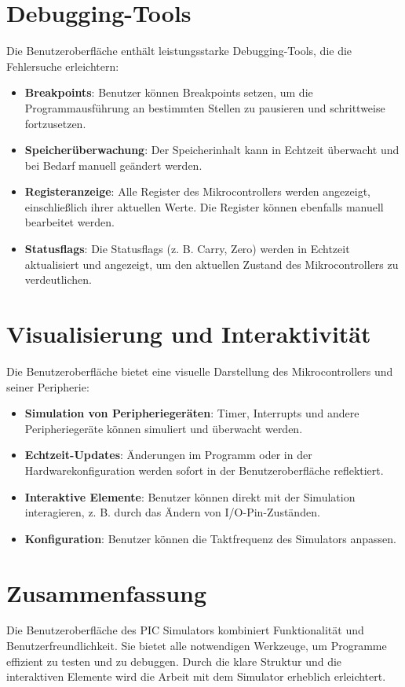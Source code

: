 \section{Debugging-Tools}
Die Benutzeroberfläche enthält leistungsstarke Debugging-Tools, die die Fehlersuche erleichtern:
\begin{itemize}
    \item \textbf{Breakpoints}: Benutzer können Breakpoints setzen, um die Programmausführung an bestimmten Stellen zu pausieren und schrittweise fortzusetzen.
    \item \textbf{Speicherüberwachung}: Der Speicherinhalt kann in Echtzeit überwacht und bei Bedarf manuell geändert werden.
    \item \textbf{Registeranzeige}: Alle Register des Mikrocontrollers werden angezeigt, einschließlich ihrer aktuellen Werte. Die Register können ebenfalls manuell bearbeitet werden.
    \item \textbf{Statusflags}: Die Statusflags (z. B. Carry, Zero) werden in Echtzeit aktualisiert und angezeigt, um den aktuellen Zustand des Mikrocontrollers zu verdeutlichen.
\end{itemize}

\section{Visualisierung und Interaktivität}
Die Benutzeroberfläche bietet eine visuelle Darstellung des Mikrocontrollers und seiner Peripherie:
\begin{itemize}
    \item \textbf{Simulation von Peripheriegeräten}: Timer, Interrupts und andere Peripheriegeräte können simuliert und überwacht werden.
    \item \textbf{Echtzeit-Updates}: Änderungen im Programm oder in der Hardwarekonfiguration werden sofort in der Benutzeroberfläche reflektiert.
    \item \textbf{Interaktive Elemente}: Benutzer können direkt mit der Simulation interagieren, z. B. durch das Ändern von I/O-Pin-Zuständen.
    \item \textbf{Konfiguration}: Benutzer können die Taktfrequenz des Simulators anpassen.
\end{itemize}

\section{Zusammenfassung}
Die Benutzeroberfläche des PIC Simulators kombiniert Funktionalität und Benutzerfreundlichkeit. Sie bietet alle notwendigen Werkzeuge, um Programme effizient zu testen und zu debuggen. Durch die klare Struktur und die interaktiven Elemente wird die Arbeit mit dem Simulator erheblich erleichtert.






